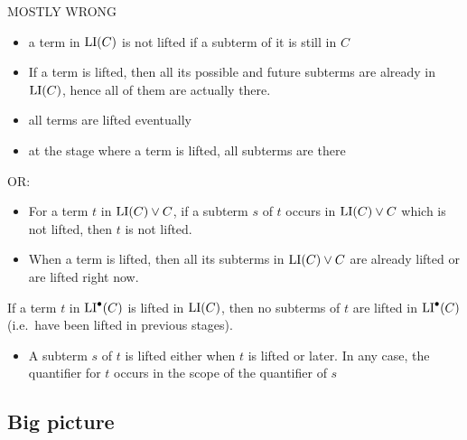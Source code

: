 \documentclass[,%
	draft=false,%
	numbers=noendperiod
	12pt,
	a4paper,
	oneside,%
	openany,
]{memoir}
\begin{document}
{ 
	MOSTLY WRONG 

	\tiny



\begin{itemize}
	\item
		a term in $\operatorname{LI}(C)$ is not lifted if a subterm of it is still in $C$ 

	\item
		If a term is lifted, then all its possible and future subterms are already in $\operatorname{LI}(C)$, hence all of them are actually there.

	\item
		all terms are lifted eventually

	\item
		at the stage where a term is lifted, all subterms are there

\end{itemize}

OR:

\begin{itemize}
	\item
		For a term $t$ in $\operatorname{LI}(C) \lor C$, if a subterm $s$ of $t$ occurs in $\operatorname{LI}(C) \lor C$ which is not lifted, then $t$ is not lifted.

	\item 
		When a term is lifted, then all its subterms in $\operatorname{LI}(C) \lor C$ are already lifted or are lifted right now.

\end{itemize}
}

\begin{clemma}
	If a term $t$ in $\operatorname{LI}^\bullet(C)$ is lifted in $\operatorname{LI}(C)$, then no subterms of $t$ are lifted in $\operatorname{LI}^\bullet(C)$ (i.e.\ have been lifted in previous stages).
\end{clemma}

\begin{itemize}
	\item A subterm $s$ of $t$ is lifted either when $t$ is lifted or later. 
		In any case, the quantifier for $t$ occurs in the scope of the quantifier of $s$
\end{itemize}


\subsection{Big picture}
\end{document}

